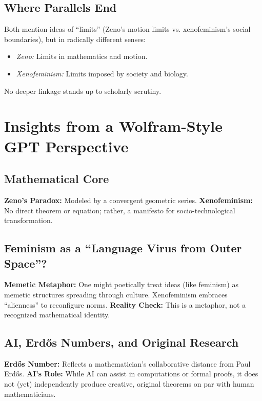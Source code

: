 \documentclass[12pt]{article}
\begin{document}
\subsection{Where Parallels End}

Both mention ideas of ``limits'' (Zeno’s motion limits vs. xenofeminism’s social boundaries), but in radically different senses:
\begin{itemize}
    \item \textit{Zeno:} Limits in mathematics and motion.
    \item \textit{Xenofeminism:} Limits imposed by society and biology.
\end{itemize}
No deeper linkage stands up to scholarly scrutiny.

\section{Insights from a Wolfram-Style GPT Perspective}

\subsection{Mathematical Core}

\textbf{Zeno’s Paradox:} Modeled by a convergent geometric series.  
\textbf{Xenofeminism:} No direct theorem or equation; rather, a manifesto for socio-technological transformation.

\subsection{Feminism as a “Language Virus from Outer Space”?}

\textbf{Memetic Metaphor:} One might poetically treat ideas (like feminism) as memetic structures spreading through culture. Xenofeminism embraces “alienness” to reconfigure norms.  
\textbf{Reality Check:} This is a metaphor, not a recognized mathematical identity.  

\subsection{AI, Erdős Numbers, and Original Research}

\textbf{Erdős Number:} Reflects a mathematician’s collaborative distance from Paul Erdős.  
\textbf{AI’s Role:} While AI can assist in computations or formal proofs, it does not (yet) independently produce creative, original theorems on par with human mathematicians.
\end{document}

